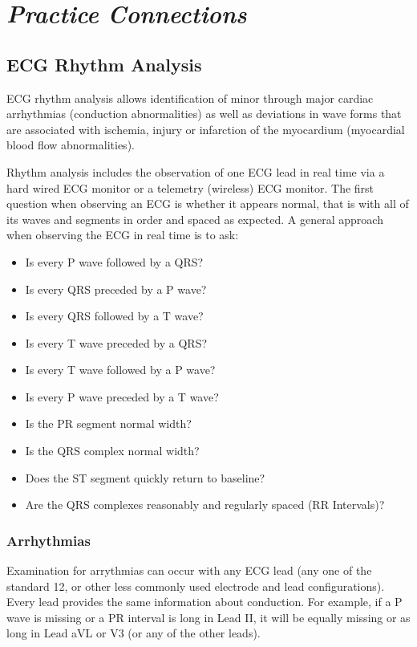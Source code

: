\section{\textit{Practice Connections}} 

\subsection{ECG Rhythm Analysis}

ECG rhythm analysis allows identification of minor through major cardiac arrhythmias (conduction abnormalities) as well as deviations in wave forms that are associated with ischemia, injury or infarction of the myocardium (myocardial blood flow abnormalities). 

Rhythm analysis includes the observation of one ECG lead in real time via a hard wired ECG monitor or a telemetry (wireless) ECG monitor. The first question when observing an ECG is whether it appears normal, that is with all of its waves and segments in order and spaced as expected. A general approach when observing the ECG in real time is to ask:

\begin{itemize}
    \item Is every P wave followed by a QRS?
    \item Is every QRS preceded by a P wave?
    \item Is every QRS followed by a T wave?
    \item Is every T wave preceded by a QRS?
    \item Is every T wave followed by a P wave?
    \item Is every P wave preceded by a T wave?
    \item Is the PR segment normal width?
    \item Is the QRS complex normal width?
    \item Does the ST segment quickly return to baseline?
    \item Are the QRS complexes reasonably and regularly spaced (RR Intervals)?
\end{itemize}


\subsubsection{Arrhythmias}

Examination for arrythmias can occur with any ECG lead (any one of the standard 12, or other less commonly used electrode and lead configurations). Every lead provides the same information about conduction. For example, if a P wave is missing or a PR interval is long in Lead II, it will be equally missing or as long in Lead aVL or V3 (or any of the other leads). 

